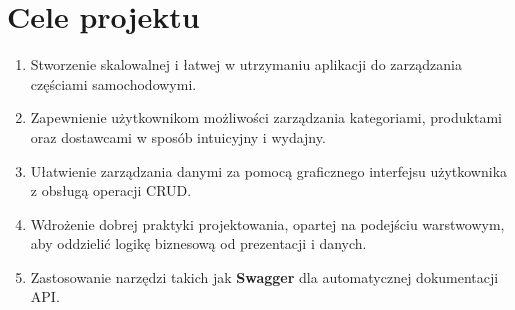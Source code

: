 \section*{Cele projektu}
\begin{enumerate}
    \item Stworzenie skalowalnej i łatwej w utrzymaniu aplikacji do zarządzania częściami samochodowymi.
    \item Zapewnienie użytkownikom możliwości zarządzania kategoriami, produktami oraz dostawcami w sposób intuicyjny i wydajny.
    \item Ułatwienie zarządzania danymi za pomocą graficznego interfejsu użytkownika z obsługą operacji CRUD.
    \item Wdrożenie dobrej praktyki projektowania, opartej na podejściu warstwowym, aby oddzielić logikę biznesową od prezentacji i danych.
    \item Zastosowanie narzędzi takich jak \textbf{Swagger} dla automatycznej dokumentacji API.
\end{enumerate}
\newpage

